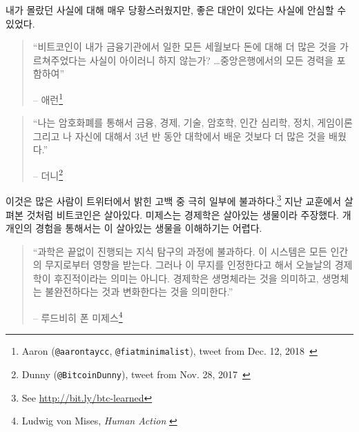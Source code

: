 내가 몰랐던 사실에 대해 매우 당황스러웠지만,
좋은 대안이 있다는 사실에 안심할 수 있었다.

\begin{quotation}\begin{samepage}
		\enquote{비트코인이 내가 금융기관에서 일한 모든 세월보다 돈에 대해 더 많은 것을 가르쳐주었다는 사실이 
			아이러니 하지 않는가? \ldots 중앙은행에서의 모든 경력을 포함하여}
		\begin{flushright} -- 애런\footnote{Aaron (\texttt{@aarontaycc}, \texttt{@fiatminimalist}), tweet from Dec.
				12, 2018~\cite{aarontaycc-tweet}}
\end{flushright}\end{samepage}\end{quotation}

\begin{quotation}\begin{samepage}
		\enquote{나는 암호화폐를 통해서 금융, 경제, 기술, 암호학, 인간 심리학, 정치, 게임이론 그리고 나 자신에 대해서
			3년 반 동안 대학에서 배운 것보다 더 많은 것을 배웠다.}
		\begin{flushright} -- 더니\footnote{Dunny (\texttt{@BitcoinDunny}), tweet from Nov. 28,
				2017~\cite{bitcoindunny-tweet}}
\end{flushright}\end{samepage}\end{quotation}

이것은 많은 사람이 트위터에서 밝힌 고백 중 극히 일부에 불과하다.\footnote{See
	\url{http://bit.ly/btc-learned}} 
지난 교훈에서 살펴본 것처럼 비트코인은 살아있다. 
미제스는 경제학은 살아있는 생물이라 주장했다. 
개개인의 경험을 통해서는 이 살아있는 생물을 이해하기는 어렵다.

\begin{quotation}\begin{samepage}
		\enquote{과학은 끝없이 진행되는 지식 탐구의 과정에 불과하다. 
			이 시스템은 모든 인간의 무지로부터 영향을 받는다. 
			그러나 이 무지를 인정한다고 해서 오늘날의 경제학이 후진적이라는 의미는 아니다.
			경제학은 생명체라는 것을 의미하고, 
			생명체는 불완전하다는 것과 변화한다는 것을 의미한다.}
		\begin{flushright} -- 루드비히 폰 미제스\footnote{Ludwig von Mises, \textit{Human Action}
				\cite{human-action}}
\end{flushright}\end{samepage}\end{quotation}

